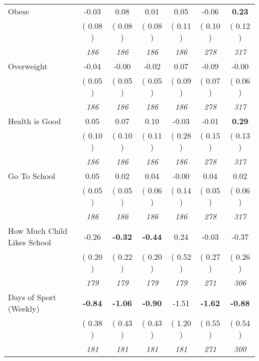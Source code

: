 \begin{tabular}{l c c c c c c}
Obese &     -0.03 &      0.08 &      0.01 &      0.05 &     -0.06 & \textbf{      0.23 } \\
& (     0.08 ) & (     0.08 ) & (     0.08 ) & (     0.11 ) & (     0.10 ) & (     0.12 ) \\
& \textit{ 186 } & \textit{ 186 } & \textit{ 186 } & \textit{ 186 } & \textit{ 278 } & \textit{ 317 } \\
Overweight &     -0.04 &     -0.00 &     -0.02 &      0.07 &     -0.09 &     -0.00 \\
& (     0.05 ) & (     0.05 ) & (     0.05 ) & (     0.09 ) & (     0.07 ) & (     0.06 ) \\
& \textit{ 186 } & \textit{ 186 } & \textit{ 186 } & \textit{ 186 } & \textit{ 278 } & \textit{ 317 } \\
Health is Good &      0.05 &      0.07 &      0.10 &     -0.03 &     -0.01 & \textbf{      0.29 } \\
& (     0.10 ) & (     0.10 ) & (     0.11 ) & (     0.28 ) & (     0.15 ) & (     0.13 ) \\
& \textit{ 186 } & \textit{ 186 } & \textit{ 186 } & \textit{ 186 } & \textit{ 278 } & \textit{ 317 } \\
Go To School &      0.05 &      0.02 &      0.04 &     -0.00 &      0.04 &      0.02 \\
& (     0.05 ) & (     0.05 ) & (     0.06 ) & (     0.14 ) & (     0.05 ) & (     0.06 ) \\
& \textit{ 186 } & \textit{ 186 } & \textit{ 186 } & \textit{ 186 } & \textit{ 278 } & \textit{ 317 } \\
How Much Child Likes School &     -0.26 & \textbf{     -0.32 } & \textbf{     -0.44 } &      0.24 &     -0.03 &     -0.37 \\
& (     0.20 ) & (     0.22 ) & (     0.20 ) & (     0.52 ) & (     0.27 ) & (     0.26 ) \\
& \textit{ 179 } & \textit{ 179 } & \textit{ 179 } & \textit{ 179 } & \textit{ 271 } & \textit{ 306 } \\
Days of Sport (Weekly) & \textbf{     -0.84 } & \textbf{     -1.06 } & \textbf{     -0.90 } &     -1.51 & \textbf{     -1.62 } & \textbf{     -0.88 } \\
& (     0.38 ) & (     0.43 ) & (     0.43 ) & (     1.20 ) & (     0.55 ) & (     0.54 ) \\
& \textit{ 181 } & \textit{ 181 } & \textit{ 181 } & \textit{ 181 } & \textit{ 271 } & \textit{ 300 } \\
\bottomrule
\end{tabular}
